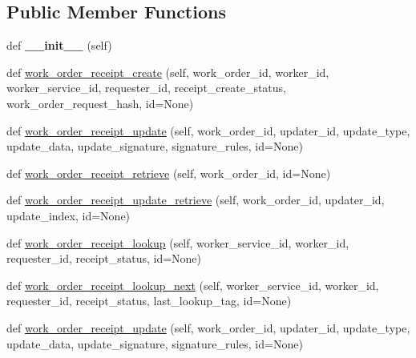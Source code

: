 \subsection*{Public Member Functions}
\begin{DoxyCompactItemize}
\item 
\mbox{\label{classavalon__sdk_1_1connector_1_1interfaces_1_1work__order__receipt_1_1WorkOrderReceipt_a47f9e7192f4803e9be017623190c9371}} 
def {\bfseries \+\_\+\+\_\+init\+\_\+\+\_\+} (self)
\item 
def \hyperlink{classavalon__sdk_1_1connector_1_1interfaces_1_1work__order__receipt_1_1WorkOrderReceipt_aea0e8a6e18895ed8ac796c83b73a69a2}{work\+\_\+order\+\_\+receipt\+\_\+create} (self, work\+\_\+order\+\_\+id, worker\+\_\+id, worker\+\_\+service\+\_\+id, requester\+\_\+id, receipt\+\_\+create\+\_\+status, work\+\_\+order\+\_\+request\+\_\+hash, id=None)
\item 
def \hyperlink{classavalon__sdk_1_1connector_1_1interfaces_1_1work__order__receipt_1_1WorkOrderReceipt_ac5b1f9823491b4b24daa50d146b7ec43}{work\+\_\+order\+\_\+receipt\+\_\+update} (self, work\+\_\+order\+\_\+id, updater\+\_\+id, update\+\_\+type, update\+\_\+data, update\+\_\+signature, signature\+\_\+rules, id=None)
\item 
def \hyperlink{classavalon__sdk_1_1connector_1_1interfaces_1_1work__order__receipt_1_1WorkOrderReceipt_ab9d041cca5f340a855d5b66a92ba4e77}{work\+\_\+order\+\_\+receipt\+\_\+retrieve} (self, work\+\_\+order\+\_\+id, id=None)
\item 
def \hyperlink{classavalon__sdk_1_1connector_1_1interfaces_1_1work__order__receipt_1_1WorkOrderReceipt_adbe2f408a3c771bfe9b00a061f66cfc7}{work\+\_\+order\+\_\+receipt\+\_\+update\+\_\+retrieve} (self, work\+\_\+order\+\_\+id, updater\+\_\+id, update\+\_\+index, id=None)
\item 
def \hyperlink{classavalon__sdk_1_1connector_1_1interfaces_1_1work__order__receipt_1_1WorkOrderReceipt_add7d65c68d7c3c96595fb0fe5bc7aa56}{work\+\_\+order\+\_\+receipt\+\_\+lookup} (self, worker\+\_\+service\+\_\+id, worker\+\_\+id, requester\+\_\+id, receipt\+\_\+status, id=None)
\item 
def \hyperlink{classavalon__sdk_1_1connector_1_1interfaces_1_1work__order__receipt_1_1WorkOrderReceipt_a894e2753ff5991c72a0c351c010cd093}{work\+\_\+order\+\_\+receipt\+\_\+lookup\+\_\+next} (self, worker\+\_\+service\+\_\+id, worker\+\_\+id, requester\+\_\+id, receipt\+\_\+status, last\+\_\+lookup\+\_\+tag, id=None)
\item 
def \hyperlink{classavalon__sdk_1_1connector_1_1interfaces_1_1work__order__receipt_1_1WorkOrderReceipt_ac5b1f9823491b4b24daa50d146b7ec43}{work\+\_\+order\+\_\+receipt\+\_\+update} (self, work\+\_\+order\+\_\+id, updater\+\_\+id, update\+\_\+type, update\+\_\+data, update\+\_\+signature, signature\+\_\+rules, id=None)
\end{DoxyCompactItemize}


